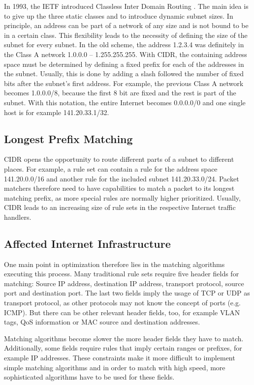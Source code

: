 \documentclass[a4paper,
		12pt,
		parskip=full,
		titlepage
		]{scrartcl}
\begin{document}
In 1993, the IETF introduced Classless Inter Domain Routing\cite{rfc1518} \cite{rfc4632}.
The main idea is to give up the three static classes and to introduce dynamic subnet sizes.
In principle, an address can be part of a network of any size and is not bound to be in a certain class.
This flexibility leads to the necessity of defining the size of the subnet for every subnet.
In the old scheme, the address 1.2.3.4 was definitely in the Class A network 1.0.0.0 -- 1.255.255.255.
With CIDR, the containing address space must be determined by defining a fixed prefix for each of the addresses in the subnet.
Usually, this is done by adding a slash followed the number of fixed bits after the subnet's first address.
For example, the previous Class A network becomes 1.0.0.0/8, because the first 8 bit are fixed and the rest is part of the subnet.
With this notation, the entire Internet becomes 0.0.0.0/0 and one single host is for example 141.20.33.1/32.

\subsection{Longest Prefix Matching}
CIDR opens the opportunity to route different parts of a subnet to different places.
For example, a rule set can contain a rule for the address space 141.20.0.0/16 and another rule for the included subnet 141.20.33.0/24.
Packet matchers therefore need to have capabilities to match a packet to its longest matching prefix, as more special rules are normally higher prioritized.
Usually, CIDR leads to an increasing size of rule sets in the respective Internet traffic handlers. 

\subsection{Affected Internet Infrastructure}
One main point in optimization therefore lies in the matching algorithms executing this process. %
Many traditional rule sets require five header fields for matching: Source IP address, destination IP address, transport protocol, source port and destination port.
The last two fields imply the usage of TCP or UDP as transport protocol, as other protocols may not know the concept of ports (e.g. ICMP). %
But there can be other relevant header fields, too, for example VLAN tags, QoS information or MAC source and destination addresses.%

Matching algorithms become slower the more header fields they have to match.
Additionally, some fields require rules that imply certain ranges or prefixes, for example IP addresses.
These constraints make it more difficult to implement simple matching algorithms and in order to match with high speed, more sophisticated
algorithms have to be used for these fields.
\end{document}
